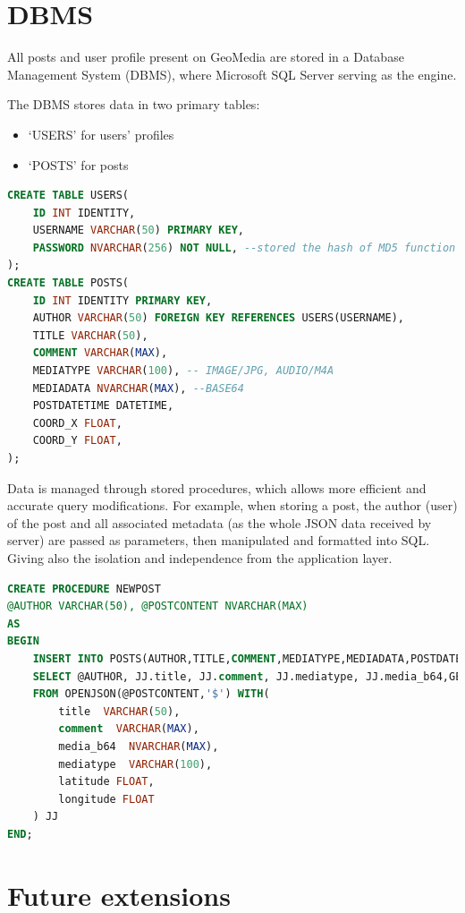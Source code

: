 \documentclass[conference]{IEEEtran}
\begin{document}
\section{DBMS}

All posts and user profile present on GeoMedia are stored in a Database Management System (DBMS), where Microsoft SQL Server\cite{b7} serving as the engine.

The DBMS stores data in two primary tables:

\begin{itemize}
    \item `USERS' for users' profiles
    \item `POSTS' for posts 
\end{itemize}

\begin{lstlisting}[language=SQL, caption=Tables creation]
CREATE TABLE USERS(
    ID INT IDENTITY,
    USERNAME VARCHAR(50) PRIMARY KEY,
    PASSWORD NVARCHAR(256) NOT NULL, --stored the hash of MD5 function
);
CREATE TABLE POSTS(
	ID INT IDENTITY PRIMARY KEY,
	AUTHOR VARCHAR(50) FOREIGN KEY REFERENCES USERS(USERNAME),
	TITLE VARCHAR(50),
	COMMENT VARCHAR(MAX),
	MEDIATYPE VARCHAR(100), -- IMAGE/JPG, AUDIO/M4A
	MEDIADATA NVARCHAR(MAX), --BASE64
	POSTDATETIME DATETIME,
	COORD_X FLOAT,
	COORD_Y FLOAT,
);
\end{lstlisting}

Data is managed through stored procedures, which allows more efficient and accurate query modifications. For example, when storing a post,
the author (user) of the post and all associated metadata (as the whole JSON data received by server) are passed as parameters, then manipulated and formatted into SQL. Giving also the isolation and independence from the application layer.

\begin{lstlisting}[language=SQL, caption=Stored Procedure of post creation]
CREATE PROCEDURE NEWPOST
@AUTHOR VARCHAR(50), @POSTCONTENT NVARCHAR(MAX)
AS
BEGIN
	INSERT INTO POSTS(AUTHOR,TITLE,COMMENT,MEDIATYPE,MEDIADATA,POSTDATETIME, LATITUDE, LONGITUDE)
	SELECT @AUTHOR, JJ.title, JJ.comment, JJ.mediatype, JJ.media_b64,GETDATE(), JJ.latitude ,JJ.longitude 
	FROM OPENJSON(@POSTCONTENT,'$') WITH(
		title  VARCHAR(50),
		comment  VARCHAR(MAX),
		media_b64  NVARCHAR(MAX),
		mediatype  VARCHAR(100),
		latitude FLOAT,
		longitude FLOAT
	) JJ
END;

\end{lstlisting}


\section{Future extensions}
\end{document}

